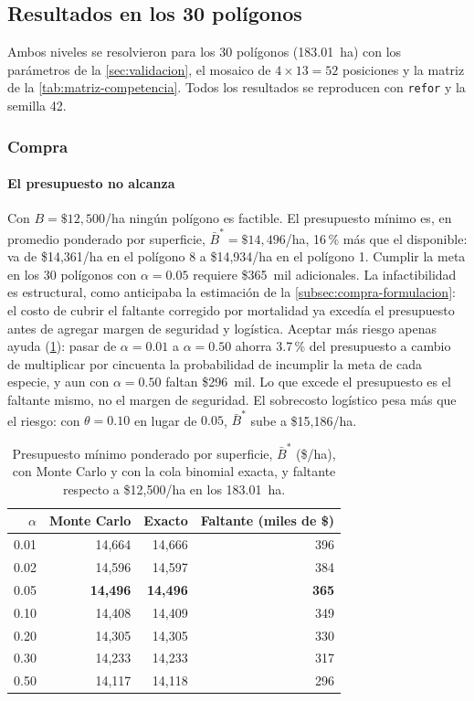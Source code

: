 \subsection{Resultados en los 30 polígonos}
\label{sec:resultados}

Ambos niveles se resolvieron para los 30 polígonos (183.01~ha) con los parámetros de la \cref{sec:validacion}, el mosaico de $4\times13=52$ posiciones y la matriz de la \cref{tab:matriz-competencia}. Todos los resultados se reproducen con \texttt{refor} y la semilla 42.

\subsubsection{Compra}
\label{subsec:res-compra}

\paragraph{El presupuesto no alcanza} Con $B=\$12{,}500$/ha ningún polígono es factible. El presupuesto mínimo es, en promedio ponderado por superficie, $\bar{B}^{*}=\$14{,}496$/ha, 16\,\% más que el disponible: va de \$14{,}361/ha en el polígono 8 a \$14{,}934/ha en el polígono 1. Cumplir la meta en los 30 polígonos con $\alpha=0.05$ requiere \$365~mil adicionales. La infactibilidad es estructural, como anticipaba la estimación de la \cref{subsec:compra-formulacion}: el costo de cubrir el faltante corregido por mortalidad ya excedía el presupuesto antes de agregar margen de seguridad y logística. Aceptar más riesgo apenas ayuda (\cref{tab:frontera}): pasar de $\alpha=0.01$ a $\alpha=0.50$ ahorra 3.7\,\% del presupuesto a cambio de multiplicar por cincuenta la probabilidad de incumplir la meta de cada especie, y aun con $\alpha=0.50$ faltan \$296~mil. Lo que excede el presupuesto es el faltante mismo, no el margen de seguridad. El sobrecosto logístico pesa más que el riesgo: con $\theta=0.10$ en lugar de $0.05$, $\bar{B}^{*}$ sube a \$15{,}186/ha.

\begin{table}[t]
\centering
\caption{Presupuesto mínimo ponderado por superficie, $\bar{B}^{*}$ (\$/ha), con Monte Carlo y con la cola binomial exacta, y faltante respecto a \$12{,}500/ha en los 183.01~ha.}
\label{tab:frontera}
\small
\begin{tabular}{@{}rrrr@{}}
\toprule
$\alpha$ & Monte Carlo & Exacto & Faltante (miles de \$) \\
\midrule
0.01 & 14{,}664 & 14{,}666 & 396 \\
0.02 & 14{,}596 & 14{,}597 & 384 \\
0.05 & \textbf{14{,}496} & \textbf{14{,}496} & \textbf{365} \\
0.10 & 14{,}408 & 14{,}409 & 349 \\
0.20 & 14{,}305 & 14{,}305 & 330 \\
0.30 & 14{,}233 & 14{,}233 & 317 \\
0.50 & 14{,}117 & 14{,}118 & 296 \\
\bottomrule
\end{tabular}
\end{table}

